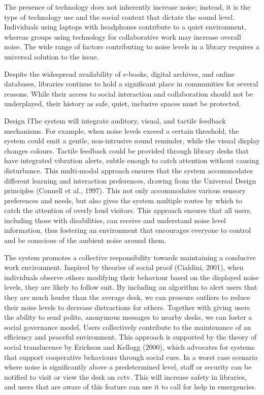 \documentclass{novel}
\begin{document}
The presence of technology does not inherently increase noise; instead, it is the type of technology use and the social context that dictate the sound level. Individuals using laptops with headphones contribute to a quiet environment, whereas groups using technology for collaborative work may increase overall noise. The wide range of factors contributing to noise levels in a library requires a universal solution to the issue.

Despite the widespread availability of e-books, digital archives, and online databases, libraries continue to hold a significant place in communities for several reasons. While their access to social interaction and collaboration should not be underplayed, their history as safe, quiet, inclusive spaces must be protected.

\h{Design}
\l{T}he system will integrate auditory, visual, and tactile feedback mechanisms. For example, when noise levels exceed a certain threshold, the system could emit a gentle, non-intrusive sound reminder, while the visual display changes colours. Tactile feedback could be provided through library desks that have integrated vibration alerts, subtle enough to catch attention without causing disturbance. This multi-modal approach ensures that the system accommodates different learning and interaction preferences, drawing from the Universal Design principles (Connell et al., 1997). This not only accommodates various sensory preferences and needs, but also gives the system multiple routes by which to catch the attention of overly loud visitors. This approach ensures that all users, including those with disabilities, can receive and understand noise level information, thus fostering an environment that encourages everyone to control and be conscious of the ambient noise around them.

The system promotes a collective responsibility towards maintaining a conducive work environment. Inspired by theories of social proof (Cialdini, 2001), when individuals observe others modifying their behaviour based on the displayed noise levels, they are likely to follow suit. By including an algorithm to alert users that they are much louder than the average desk, we can pressure outliers to reduce their noise levels to decrease distractions for others. Together with giving users the ability to send polite, anonymous messages to nearby desks, we can foster a social governance model. Users collectively contribute to the maintenance of an efficiency and peaceful environment. This approach is supported by the theory of social translucence by Erickson and Kellogg (2000), which advocates for systems that support cooperative behaviours through social cues. In a worst case scenario where noise is significantly above a predetermined level, staff or security can be notified to visit or view the desk on cctv. This will increase safety in libraries, and users that are aware of this feature can use it to call for help in emergencies.
\end{document}
